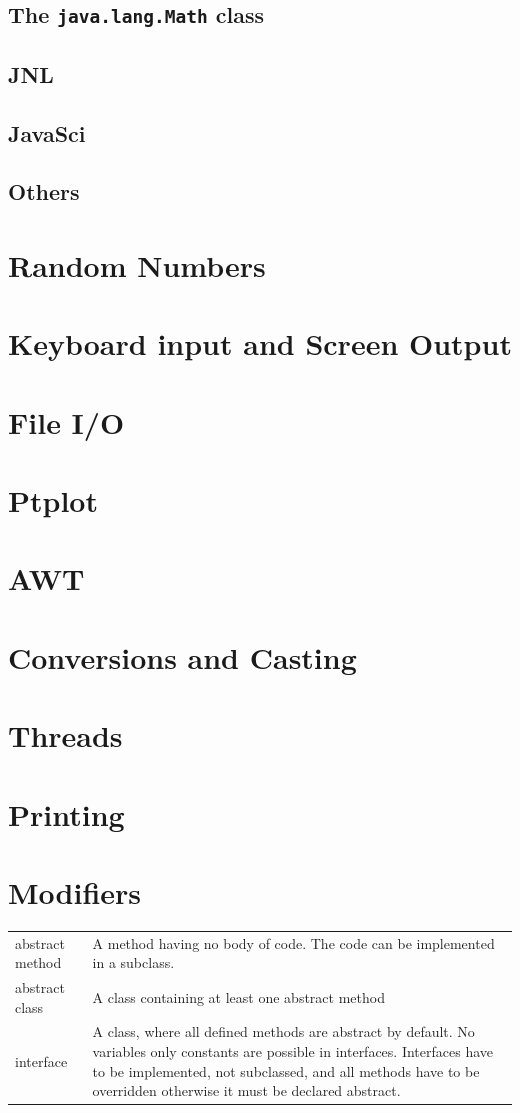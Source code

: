 \subsection{The \texttt{java.lang.Math} class}
\subsection{JNL}
\subsection{JavaSci}
\subsection{Others}
\label{sec:Others}
\section{Random Numbers}
\section{Keyboard input and Screen Output}
\section{File I/O}
\section{Ptplot}
\section{AWT}
\section{Conversions and Casting}
\section{Threads}
\section{Printing}
\section{Modifiers}
  \begin{center}
    \begin{tabular}{ll}
      abstract method & A method having no body of code. The code can
        be implemented in a subclass.\\
      abstract class & A class containing at least one abstract method \\
      interface & A class, where all defined methods are abstract by default.
        No variables only constants are possible in interfaces. Interfaces
        have to be implemented, not subclassed, and all methods have to be
        overridden otherwise it must be declared abstract.\\
    \end{tabular}
  \end{center}
